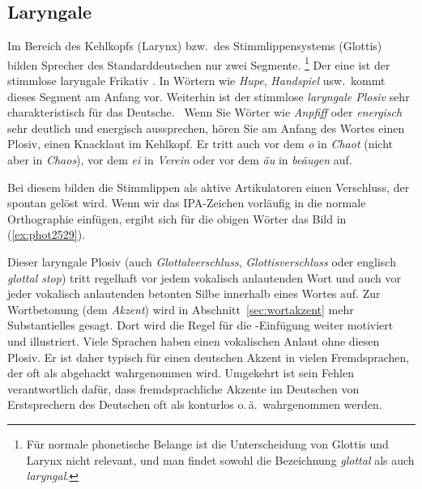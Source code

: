 \subsection{Laryngale}

\label{sec:laryngale}


Im Bereich des Kehlkopfs (Larynx) bzw.\ des Stimmlippensystems (Glottis) bilden Sprecher des Standarddeutschen nur zwei Segmente.%
\footnote{Für normale phonetische Belange ist die Unterscheidung von Glottis und Larynx nicht relevant, und man findet sowohl die Bezeichnung \textit{glottal} als auch \textit{laryngal}.}
Der eine ist der stimmlose laryngale Frikativ \textipa{[h]}.
In Wörtern wie \textit{Hupe}, \textit{Handspiel} usw.\ kommt dieses Segment am Anfang vor.
Weiterhin ist der stimmlose \textit{laryngale Plosiv} \textipa{[P]} sehr charakteristisch für das Deutsche.
\TuBegin~Wenn Sie Wörter wie \textit{Anpfiff} oder \textit{energisch} sehr deutlich und energisch aussprechen, hören Sie am Anfang des Wortes einen Plosiv, einen Knacklaut im Kehlkopf.
Er tritt auch vor dem \textit{o} in \textit{Chaot} (nicht aber in \textit{Chaos}), vor dem \textit{ei} in \textit{Verein} oder vor dem \textit{äu} in \textit{beäugen} auf.

Bei diesem bilden die Stimmlippen als aktive Artikulatoren einen Verschluss, der spontan gelöst wird.
Wenn wir das IPA-Zeichen  vorläufig in die normale Orthographie einfügen, ergibt sich für die obigen Wörter das Bild in (\ref{ex:phot2529}).

\begin{exe}
  \ex\label{ex:phot2529}
  \begin{xlist}
  \end{xlist}
\end{exe}

Dieser laryngale Plosiv (auch \textit{Glottalverschluss}, \textit{Glottisverschluss} oder englisch \textit{glottal stop}) tritt regelhaft vor jedem vokalisch anlautenden Wort und auch vor jeder vokalisch anlautenden betonten Silbe innerhalb eines Wortes auf.
Zur Wortbetonung (dem \textit{Akzent}) wird in Abschnitt~\ref{sec:wortakzent} mehr Substantielles gesagt.
Dort wird die Regel für die \textipa{[P]}-Einfügung weiter motiviert und illustriert.
Viele Sprachen haben einen vokalischen Anlaut ohne diesen Plosiv.
Er ist daher typisch für einen deutschen Akzent in vielen Fremdsprachen, der oft als abgehackt wahrgenommen wird.
Umgekehrt ist sein Fehlen verantwortlich dafür, dass fremdsprachliche Akzente im Deutschen von Erstsprechern des Deutschen oft als konturlos o.\,ä.\ wahrgenommen werden.

